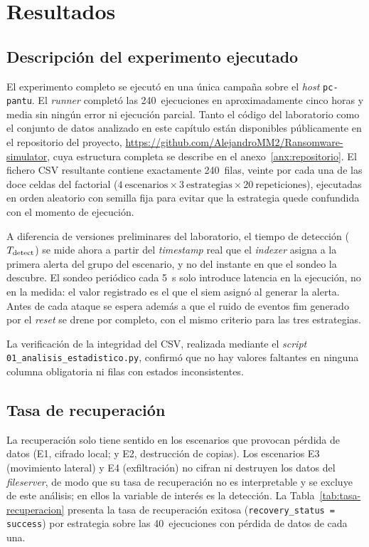 \documentclass[../main.tex]{subfiles}
\begin{document}

\chapter{Resultados}
\label{C:resultados}

\section{Descripción del experimento ejecutado}
\label{sec:experimento-ejecutado}

El experimento completo se ejecutó en una única campaña sobre el \emph{host}
\texttt{pc-pantu}. El \emph{runner} completó las 240~ejecuciones en aproximadamente
cinco horas y media sin ningún error ni ejecución parcial. Tanto el código del
laboratorio como el conjunto de datos analizado en este capítulo están
disponibles públicamente en el repositorio del proyecto,
\url{https://github.com/AlejandroMM2/Ransomware-simulator}, cuya estructura
completa se describe en el anexo~\ref{anx:repositorio}. El fichero CSV resultante
contiene exactamente 240~filas, veinte por cada una de las doce celdas del factorial
($4~\text{escenarios} \times 3~\text{estrategias} \times 20~\text{repeticiones}$),
ejecutadas en orden aleatorio con semilla fija para evitar que la estrategia quede
confundida con el momento de ejecución.

A diferencia de versiones preliminares del laboratorio, el tiempo de detección
($T_{\text{detect}}$) se mide ahora a partir del \emph{timestamp} real que el \emph{indexer}
asigna a la primera alerta del grupo del escenario, y no del instante en que el
sondeo la descubre. El sondeo periódico cada 5~s solo introduce latencia en la
ejecución, no en la medida: el valor registrado es el que el \gls{siem} asignó al
generar la alerta. Antes de cada ataque se espera además a que el ruido de eventos
\gls{fim} generado por el \emph{reset} se drene por completo, con el mismo criterio
para las tres estrategias.

La verificación de la integridad del CSV, realizada mediante el \emph{script}
\texttt{01\_analisis\_estadistico.py}, confirmó que no hay valores faltantes en
ninguna columna obligatoria ni filas con estados inconsistentes.

\section{Tasa de recuperación}

La recuperación solo tiene sentido en los escenarios que provocan pérdida de datos
(E1, cifrado local; y E2, destrucción de copias). Los escenarios E3 (movimiento
lateral) y E4 (exfiltración) no cifran ni destruyen los datos del \emph{fileserver},
de modo que su tasa de recuperación no es interpretable y se excluye de este
análisis; en ellos la variable de interés es la detección. La Tabla~\ref{tab:tasa-recuperacion}
presenta la tasa de recuperación exitosa (\texttt{recovery\_status = success}) por
estrategia sobre las 40~ejecuciones con pérdida de datos de cada una.
\end{document}
